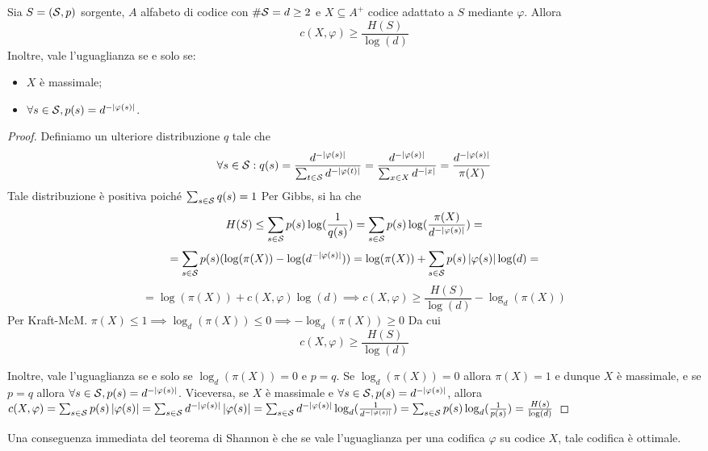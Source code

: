\begin{theorem}[Shannon]
  Sia \(S = (\mathcal{S},p)\) sorgente, \(A\) alfabeto di codice con \(\#\mathcal{S} = d \geq 2\) e \(X \subseteq A^+\) codice adattato a \(S\) mediante \(\varphi\).
  Allora
  \[c(X,\varphi) \geq \frac{H(S)}{\log(d)}\]
  Inoltre, vale l'uguaglianza se e solo se:
  \begin{itemize}
    \item \(X\) è massimale;
    \item \(\forall s\in \mathcal{S}, p(s) = d^{-\left|\varphi(s)\right|}\).
  \end{itemize}
\end{theorem}
\begin{proof}
  Definiamo un ulteriore distribuzione \(q\) tale che 
  \[\forall s \in \mathcal{S}: q(s) = \frac{d^{-\left|\varphi(s)\right|}}{\sum_{t \in \mathcal{S}} d^{-\left|\varphi(t)\right|}} = \frac{d^{-\left|\varphi(s)\right|}}{\sum_{x\in X} d^{-\left|x\right|}} = \frac{d^{-\left|\varphi(s)\right|}}{\pi(X)}\]
  Tale distribuzione è positiva poiché \(\sum_{s\in\mathcal{S}}q(s) = 1\)
  Per Gibbs, si ha che
  \[H(S) \leq \sum_{s \in \mathcal{S}} p(s) \log(\frac{1}{q(s)}) = \sum_{s \in \mathcal{S}} p(s) \log(\frac{\pi(X)}{d^{-\left|\varphi(s)\right|}}) =\]
  \[= \sum_{s \in \mathcal{S}}p(s)(\log(\pi(X))-\log(d^{-\left|\varphi(s)\right|})) = \log(\pi(X)) + \sum_{s \in \mathcal{S}}p(s)\left|\varphi(s)\right|\log(d) = \]
  \[= \log(\pi(X)) + c(X,\varphi)\log(d) \implies c(X,\varphi) \geq \frac{H(S)}{\log(d)} - \log_{d}(\pi(X))\]
  Per Kraft-McM. \(\pi(X)\leq 1 \implies \log_{d}(\pi(X)) \leq 0 \implies -\log_{d}(\pi(X)) \geq 0\)
  Da cui \[c(X,\varphi) \geq \frac{H(S)}{\log(d)}\]

  Inoltre, vale l'uguaglianza se e solo se \(\log_{d}(\pi(X)) = 0\) e \(p = q\).
  Se \(\log_{d}(\pi(X)) = 0\) allora \(\pi(X) = 1\) e dunque \(X\) è massimale, e se \(p = q\) allora \(\forall s \in \mathcal{S}, p(s) = d^{-\left|\varphi(s)\right|}\).
  Viceversa, se \(X\) è massimale e \(\forall s \in \mathcal{S}, p(s) = d^{-\left|\varphi(s)\right|}\), allora \(c(X,\varphi) = \sum_{s\in\mathcal{S}}p(s)\left|\varphi(s)\right| = \sum_{s\in\mathcal{S}}d^{-\left|\varphi(s)\right|}\left|\varphi(s)\right| = \sum_{s\in \mathcal{S}}d^{-\left|\varphi(s)\right|}\log_{d}(\frac{1}{d^{-\left|\varphi(s)\right|}}) = \sum_{s\in\mathcal{S}} p(s)\log_{d}(\frac{1}{p(s)}) = \frac{H(s)}{\log(d)}\)
\end{proof}

Una conseguenza immediata del teorema di Shannon è che se vale l'uguaglianza per una codifica \(\varphi\) su codice \(X\), tale codifica è ottimale.

